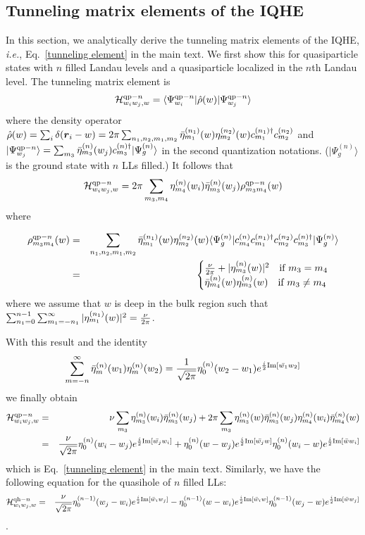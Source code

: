 \documentclass[twocolumn,floatfix,prb,aps,showpacs]{revtex4-2}
\newcommand{\be}{\begin{equation}}
\newcommand{\ee}{\end{equation}}
\newcommand{\ba}{\begin{eqnarray}}
\newcommand{\ea}{\end{eqnarray}}
\newcommand{\IH}{\mathcal{H}}
\renewcommand{\vec}[1]{\mbox{\boldmath$#1$}}
\begin{document}
\begin{appendix}
\section{Tunneling matrix elements of the IQHE}
\label{tunneling}
In this section, we analytically derive the tunneling matrix elements of the IQHE, {\it i.e.}, Eq.~\ref{tunneling element} in the main text. We first show this for quasiparticle states with $n$ filled Landau levels and a quasiparticle localized in the $n$th Landau level. The tunneling matrix element is
\be
\label{tunneling element1}
\IH_{w_i w_j,w}^{{\rm qp}-n}=\langle\Psi^{{\rm qp}-n}_{w_i} |\hat{\rho}(w)|\Psi^{{\rm qp}-n}_{w_j} \rangle
\ee
where the density operator $\hat{\rho}(w)=\sum_i\delta(\vec{r}_i-w)=2\pi\sum_{n_1,n_2,m_1,m_2}\bar{\eta}_{m_1}^{(n_1)}(w)\eta_{m_2}^{(n_2)}(w)c^{(n_1)\dagger}_{m_1}c^{(n_2)}_{m_2}$ and $|\Psi^{{\rm qp}-n}_{w_j} \rangle=\sum_{m_3}\bar{\eta}_{m_3}^{(n)}(w_j)c^{(n)\dagger}_{m_3}|\Psi_g^{(n)}\rangle$ in the second quantization notations. ($|\Psi_g^{(n)}\rangle$ is the ground state with $n$ LLs filled.) It follows that
\be
\IH_{w_i w_j,w}^{{\rm qp}-n}=2\pi\sum_{m_3,m_4}\eta_{m_4}^{(n)}(w_i)\bar{\eta}_{m_3}^{(n)}(w_j)\rho_{m_3m_4}^{{\rm qp}-n}(w)
\ee
where 
\begin{widetext}
\ba
\rho_{m_3m_4}^{{\rm qp}-n}(w)&=&\sum_{n_1,n_2,m_1,m_2}\bar{\eta}_{m_1}^{(n_1)}(w){\eta}_{m_2}^{(n_2)}(w)\langle\Psi_g^{(n)}|c_{m_4}^{(n)}c_{m_1}^{(n_1)\dagger}c_{m_2}^{(n_2)}c_{m_3}^{(n)\dagger}|\Psi_g^{(n)}\rangle\\ \nonumber
&=&
\begin{cases}
{\nu\over 2\pi}+|\eta_{m_3}^{(n)}(w)|^2 \quad\mbox{if } m_3=m_4\\
\bar{\eta}_{m_4}^{(n)}(w){\eta}_{m_3}^{(n)}(w) \quad\mbox{if } m_3\neq m_4
\end{cases}
\ea
where we assume that $w$ is deep in the bulk region such that $\sum_{n_1=0}^{n-1}\sum_{m_1=-n_1}^{\infty}|{\eta}_{m_1}^{(n_1)}(w)|^2={\nu\over 2\pi}$.

With this result and the identity
\be
\sum_{m=-n}^{\infty}\bar{\eta}_m^{(n)}(w_1){\eta}_m^{(n)}(w_2)={1\over\sqrt{2\pi}}\eta_0^{(n)}(w_2-w_1)e^{{i\over 2}{\rm Im}[\bar{w_1}w_2]}
\ee
we finally obtain
\ba
\IH_{w_i w_j,w}^{{\rm qp}-n}&=&\nu\sum_{m_3}\eta_{m_3}^{(n)}(w_i)\bar{\eta}_{m_3}^{(n)}(w_j)+2\pi\sum_{m_3}\eta_{m_3}^{(n)}(w)\bar{\eta}_{m_3}^{(n)}(w_j)\eta_{m_4}^{(n)}(w_i)\bar{\eta}_{m_4}^{(n)}(w)\\ \nonumber
&=&{\nu\over \sqrt{2\pi}}\eta_0^{(n)}(w_i-w_j)e^{{i\over 2}{\rm Im}[\bar{w_j}w_i]}+\eta_0^{(n)}(w-w_j)e^{{i\over 2}{\rm Im}[\bar{w_j}w]}\eta_0^{(n)}(w_i-w)e^{{i\over 2}{\rm Im}[\bar{w}w_i]}
\ea
which is Eq.~\ref{tunneling element} in the main text. Similarly, we have the following equation for the quasihole of $n$ filled LLs:
\ba
\IH_{w_i w_j,w}^{{\rm qh}-n}
&=&{\nu\over \sqrt{2\pi}}\eta_0^{(n-1)}(w_j-w_i)e^{{i\over 2}{\rm Im}[\bar{w}_iw_j]}-\eta_0^{(n-1)}(w-w_i)e^{{i\over 2}{\rm Im}[\bar{w}_iw]}\eta_0^{(n-1)}(w_j-w)e^{{i\over 2}{\rm Im}[\bar{w}w_j]}
\ea.
 \end{widetext}
 

\end{appendix}
\end{document}
